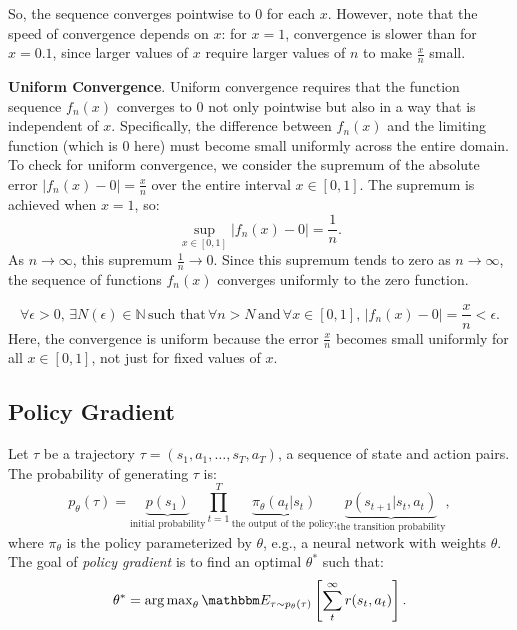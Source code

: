     So, the sequence converges pointwise to 0 for each $ x $. However, note that the speed of convergence depends on $ x $: for $ x = 1 $, convergence is slower than for $ x = 0.1 $, since larger values of $ x $ require larger values of $ n $ to make $ \frac{x}{n} $ small.
    
    \textbf{Uniform Convergence}.
    Uniform convergence requires that the function sequence $ f_n(x) $ converges to 0 not only pointwise but also in a way that is independent of $ x $. Specifically, the difference between $ f_n(x) $ and the limiting function (which is 0 here) must become small uniformly across the entire domain.
    To check for uniform convergence, we consider the supremum of the absolute error $ |f_n(x) - 0| = \frac{x}{n} $ over the entire interval $ x \in [0, 1] $.
    The supremum is achieved when $ x = 1 $, so:
    \begin{equation}
    \sup_{x \in [0, 1]} |f_n(x) - 0| = \frac{1}{n}.
    \end{equation}
    As $ n \to \infty $, this supremum $ \frac{1}{n} \to 0 $.
    Since this supremum tends to zero as $ n \to \infty $, the sequence of functions $ f_n(x) $ converges uniformly to the zero function.
    
    \begin{equation}
    \forall \epsilon > 0, \, \exists N(\epsilon) \in \mathbb{N} \, \text{such that} \, \forall n > N \, \text{and} \, \forall x \in [0, 1], \, |f_n(x) - 0| = \frac{x}{n} < \epsilon.
    \end{equation}
    Here, the convergence is uniform because the error $ \frac{x}{n} $ becomes small uniformly for all $ x \in [0, 1] $, not just for fixed values of $ x $.
    



    
\subsection{Policy Gradient}
Let $\tau$ be a trajectory $\tau = (s_1, a_1, \ldots, s_T, a_T)$, a sequence of state and action pairs. 
The probability of generating $\tau$ is:
    \begin{equation}
        p_{\theta}(\tau) = \underbrace{p(s_1)}_{\text{initial probability}} \prod_{t=1}^{T}{ \underbrace{\pi_{\theta}(a_t | s_t)}_{\text{the output of the policy;}} \underbrace{p(s_{t+1} | s_t, a_t)}_{\text{the transition probability}}},
    \end{equation}
where $\pi_{\theta}$ is the policy parameterized by $\theta$, e.g., a neural network with weights $\theta$.
The goal of \emph{policy gradient} is to find an optimal $\theta^\ast$ such that:
    \begin{equation}
        \theta^\ast = \argmax_{\theta} \E_{\tau \sim p_\theta(\tau)}\left[ \sum_{t}^{\infty}{r(s_t, a_t)} \right].
    \end{equation}
    
